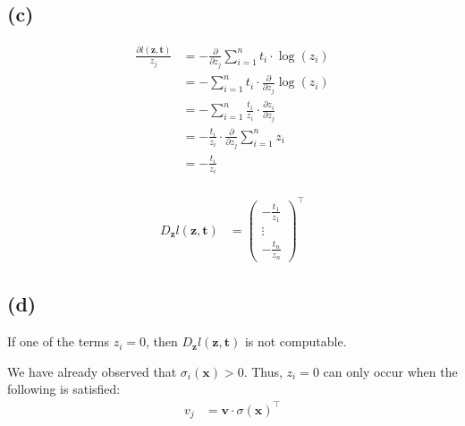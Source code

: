 \subsection*{(c)}
\begin{align*}
\frac{\partial l(\boldsymbol{z}, \boldsymbol{t})}{z_j} &= - \frac{\partial}{\partial z_j} \sum_{i=1}^n t_i \cdot \log(z_i) \\
&= - \sum_{i=1}^n t_i \cdot \frac{\partial}{\partial z_j} \log(z_i) \\
&= - \sum_{i=1}^n \frac{t_i}{z_i} \cdot \frac{\partial z_i}{\partial z_j} \\
&= -  \frac{t_i}{z_i} \cdot \frac{\partial}{\partial z_j} \sum_{i=1}^n z_i \\
&= - \frac{t_i}{z_i} \\
\end{align*}


\begin{align*}
D_{\boldsymbol{z}}l(\boldsymbol{z}, \boldsymbol{t})
&=
\begin{pmatrix}
- \frac{t_1}{z_1} \\
\vdots \\
- \frac{t_n}{z_n}
\end{pmatrix}^\top
\end{align*}

\subsection*{(d)}
If one of the terms $z_i = 0$, then $D_{\boldsymbol{z}}l(\boldsymbol{z}, \boldsymbol{t})$ is not computable.

We have already observed that $\sigma_i(\boldsymbol{x}) > 0$. Thus, $z_i = 0$ can only occur when the following is satisfied:
\begin{align*}
v_j &= \boldsymbol{v} \cdot \sigma(\boldsymbol{x})^\top
\end{align*}